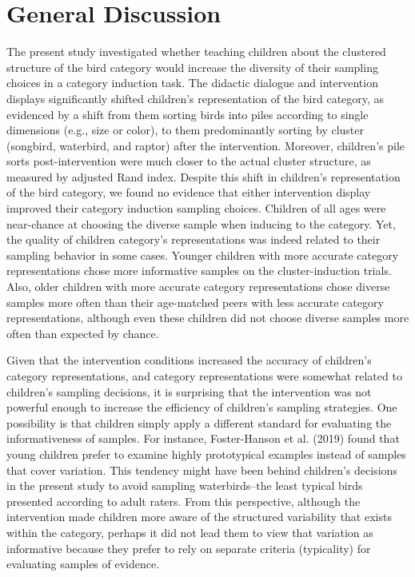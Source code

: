 \documentclass[10pt,letterpaper]{article}
\begin{document}
\section{General Discussion}
\vspace{-.1cm}
The present study investigated whether teaching children about the clustered structure of the bird category would increase the diversity of their sampling choices in a category induction task.
The didactic dialogue and intervention displays significantly shifted children's representation of the bird category, as evidenced by a shift from them sorting birds into piles according to single dimensions (e.g., size or color), to them predominantly sorting by cluster (songbird, waterbird, and raptor) after the intervention.
Moreover, children's pile sorts post-intervention were much closer to the actual cluster structure, as measured by adjusted Rand index.
Despite this shift in children's representation of the bird category, we found no evidence that either intervention display improved their category induction sampling choices. Children of all ages were near-chance at choosing the diverse sample when inducing to the category. Yet, the quality of children category's representations was indeed related to their sampling behavior in some cases. Younger children with more accurate category representations chose more informative samples on the cluster-induction trials. Also, older children with more accurate category representations chose diverse samples more often than their age-matched peers with less accurate category representations, although even these children did not choose diverse samples more often than expected by chance. 

Given that the intervention conditions increased the accuracy of children's category representations, and category representations were somewhat related to children's sampling decisions, it is surprising that the intervention was not powerful enough to increase the efficiency of children's sampling strategies. One possibility is that children simply apply a different standard for evaluating the informativeness of samples. For instance, Foster-Hanson et al. (2019) found that young children prefer to examine highly prototypical examples instead of samples that cover variation. This tendency might have been behind children's decisions in the present study to avoid sampling waterbirds--the least typical birds presented according to adult raters. From this perspective, although the intervention made children more aware of the structured variability that exists within the category, perhaps it did not lead them to view that variation as informative because they prefer to rely on separate criteria (typicality) for evaluating samples of evidence.  
\end{document}
